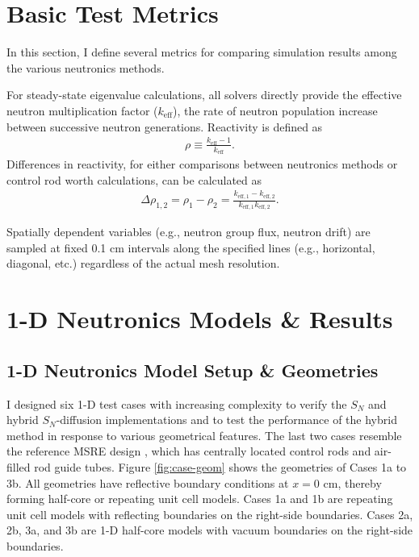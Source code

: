 \section{Basic Test Metrics} \label{sec:test-metrics}

In this section, I define several metrics for comparing simulation results among the various
neutronics methods.

For steady-state eigenvalue calculations, all solvers directly provide the effective neutron
multiplication factor ($k_\text{eff}$), the rate of neutron population increase between successive
neutron generations. Reactivity is defined as
%
\begin{gather}
  \rho \equiv \frac{k_\text{eff}-1}{k_\text{eff}}.
\end{gather}
%
Differences in reactivity, for either comparisons between neutronics methods or control rod worth
calculations, can be calculated as
%
\begin{gather}
  \Delta\rho_{1,2} = \rho_1 - \rho_2 =
  \frac{k_{\text{eff},1}-k_{\text{eff},2}}{k_{\text{eff},1}k_{\text{eff},2}}.
\end{gather}

Spatially dependent variables (e.g., neutron group flux, neutron drift) are sampled at fixed 0.1 cm
intervals along the specified lines (e.g., horizontal, diagonal, etc.) regardless of the actual
mesh resolution.

\section{1-D Neutronics Models \& Results} \label{sec:1d-results}

\subsection{1-D Neutronics Model Setup \& Geometries}

I designed six 1-D test cases with increasing complexity to verify the $S_N$ and hybrid
$S_N$-diffusion implementations and to test the performance of the hybrid
method in response to various geometrical features. The last two cases resemble the
reference \gls{MSRE} design \cite{robertson_msre_1965}, which has centrally located control rods
and air-filled rod guide tubes. Figure \ref{fig:case-geom} shows the geometries of Cases 1a to
3b. All geometries have reflective boundary conditions at $x=0$ cm, thereby
forming half-core or repeating unit cell models. Cases 1a and 1b are repeating unit
cell models with reflecting boundaries on the right-side boundaries. Cases 2a, 2b, 3a, and 3b
are 1-D half-core models with vacuum boundaries on the right-side boundaries.

